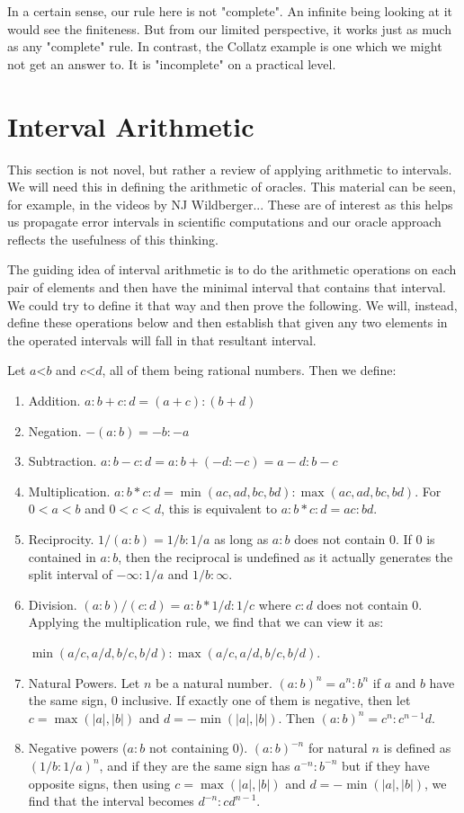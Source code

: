 \documentclass[12pt]{article}
\theoremstyle{remark}
\newcommand{\lt}{\mathord{<}}
\begin{document}
In a certain sense, our rule here is not "complete". An infinite being looking at it would see the finiteness. But from our limited perspective, it works just as much as any "complete" rule. In contrast, the Collatz example is one which we might not get an answer to. It is "incomplete" on a practical level. 

\section{Interval Arithmetic}

This section is not novel, but rather a review of applying arithmetic to intervals. We will need this in defining the arithmetic of oracles. This material can be seen, for example, in the videos by NJ Wildberger... These are of interest as this helps us propagate error intervals in scientific computations and our oracle approach reflects the usefulness of this thinking. 

The guiding idea of interval arithmetic is to do the arithmetic operations on each pair of elements and then have the minimal interval that contains that interval. We could try to define it that way and then prove the following. We will, instead, define these operations below and then establish that given any two elements in the operated intervals will fall in that resultant interval. 

Let $a \lt b$ and $c \lt d$, all of them being rational numbers. Then we define:
\begin{enumerate}
    \item Addition. $a:b + c:d = (a+c):(b+d)$
    \item Negation. $-(a:b) = -b:-a$
    \item Subtraction. $a:b - c:d = a:b + (-d:-c) = a-d:b-c$
    \item Multiplication. $a:b * c:d = \min(ac, ad, bc, bd): \max(ac,ad,bc,bd)$. For $0<a<b$ and $0<c<d$, this is equivalent to $a:b*c:d = ac:bd$. 
    \item Reciprocity. $1/(a:b) = 1/b:1/a$ as long as $a:b$ does not contain 0. If 0 is contained in $a:b$, then the reciprocal is undefined as it actually generates the split interval of $-\infty:1/a$ and $1/b:\infty$. 
    \item Division. $(a:b) / (c:d) = a:b * 1/d:1/c$ where $c:d$ does not contain 0. Applying the multiplication rule, we find that we can view it as:
    
    $\min(a/c, a/d, b/c, b/d): \max(a/c,a/d,b/c,b/d)$. 
    \item Natural Powers. Let $n$ be a natural number. $(a:b)^n = a^n:b^n$ if $a$ and $b$ have the same sign, 0 inclusive. If exactly one of them is negative, then let $c = \max (|a|, |b|)$ and $d=-\min(|a|, |b|)$. Then $(a:b)^n = c^n: c^{n-1}d $. 
    \item Negative powers ($a:b$ not containing 0). $(a:b)^{-n}$ for natural $n$ is defined as $(1/b:1/a)^n$, and if they are the same sign has $a^{-n} : b^{-n}$ but if they have opposite signs, then using  $c = \max (|a|, |b|)$ and $d=-\min(|a|, |b|)$, we find that the interval becomes $d^{-n} : c d^{n-1}$. 
\end{enumerate}
\end{document}
